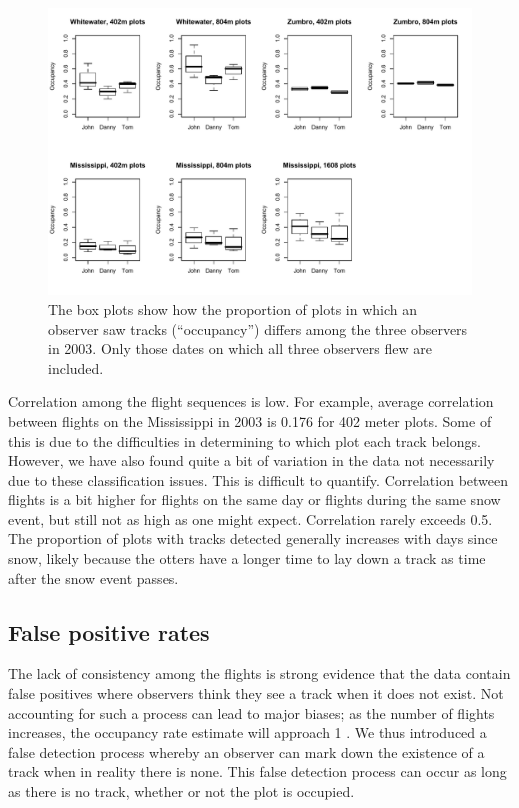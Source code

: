 \documentclass[12pt]{article}
\begin{document}
    \begin{figure}
        \centering
        \includegraphics[width=5in]{Figures/R/observerPlots.pdf}
        \caption{The box plots show how the proportion of plots in which an
        observer saw tracks (``occupancy'') differs among the three observers in
        2003. Only those dates on which all three observers flew are included.}
        \label{obsPlots}
    \end{figure}

    Correlation among the flight sequences is low. For example, average
    correlation between flights on the Mississippi in 2003 is 0.176 for 402
    meter plots. Some of this is due to the difficulties in determining to which
    plot each track belongs. However, we have also found quite a bit of
    variation in the data not necessarily due to these classification issues.
    This is difficult to quantify. Correlation between flights is a bit higher
    for
    flights on the same day or flights during the same snow event, but still not
    as high as one might expect. Correlation rarely exceeds 0.5. The proportion
    of plots with tracks detected
    generally increases with days since snow, likely because the otters have a
    longer time to lay down a track as time after the snow event passes.

    \subsection{False positive rates}
    The lack of consistency among the flights is strong evidence that the data
    contain false positives where observers think they see a track when it does
    not exist. Not accounting for such a process can lead to major biases; as
    the number of flights increases, the occupancy rate estimate will approach
    1 \cite{Royle2006}. We thus introduced a false detection process whereby an
    observer
    can mark down the existence of a track when in reality there is none. This
    false detection process can occur as long as there is no track, whether or
    not the plot is occupied.
\end{document}
